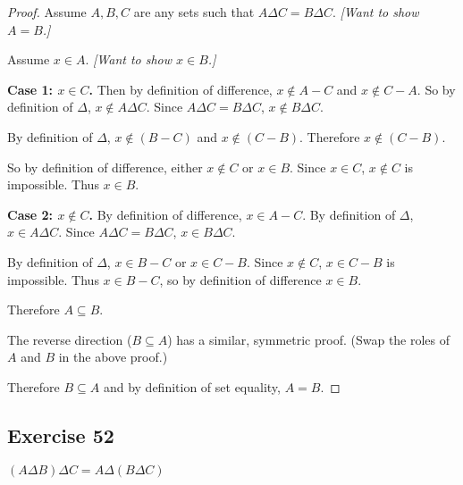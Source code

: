 \documentclass[14pt]{extarticle}
\begin{document}
\begin{proof}
  Assume $A,B,C$ are any sets such that \(A \Delta C = B \Delta C\). {\it [Want to show $A = B$.]}

  Assume $x \in A$. {\it [Want to show $x \in B$.]}

    {\bf Case 1: $x \in C$.} Then by definition of difference, \(x \notin A-C\) and \(x \notin C-A\). So by definition of
  $\Delta$, \(x \notin A \Delta C\). Since \(A \Delta C = B \Delta C\), \(x \notin B \Delta C\).

  By definition of $\Delta$, \(x \notin (B - C)\) and \(x \notin (C - B)\). Therefore \(x \notin (C - B)\).

  So by definition of difference, either \(x \notin C\) or \(x \in B\). Since \(x\in C\), \(x \notin C\) is impossible.
  Thus \(x \in B\).

    {\bf Case 2: $x \notin C$.} By definition of difference, \(x\in A-C\). By definition of $\Delta$, \(x\in A\Delta C\).
  Since \(A \Delta C = B \Delta C\), \(x \in B \Delta C\).

  By definition of $\Delta$, \(x \in B-C\) or \(x \in C-B\). Since \(x \notin C\), \(x \in C-B\) is impossible. Thus
  \(x \in B-C\), so by definition of difference \(x \in B\).

  Therefore \(A \subseteq B\).

  The reverse direction (\(B \subseteq A\)) has a similar, symmetric proof. (Swap the roles of $A$ and $B$ in the
  above proof.)

  Therefore \(B \subseteq A\) and by definition of set equality, $A = B$.
\end{proof}

\subsection{Exercise 52}
\((A \Delta B) \Delta C = A \Delta (B \Delta C)\)
\end{document}
